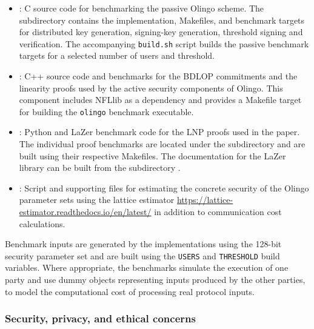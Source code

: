 \documentclass[nonacm,sigconf]{acmart}
\begin{document}
\begin{itemize}
  \item {}: C source code for benchmarking the passive Olingo scheme. The  subdirectory contains the implementation, Makefiles, and benchmark targets for distributed key generation, signing-key generation, threshold signing and verification. The accompanying \texttt{build.sh} script builds the passive benchmark targets for a selected number of users and threshold.
  \item {}: C++ source code and benchmarks for the BDLOP commitments and the linearity proofs used by the active security components of Olingo. This component includes NFLlib as a dependency and provides a Makefile target for building the \texttt{olingo} benchmark executable.
  \item {}: Python and LaZer benchmark code for the LNP proofs used in the paper. The individual proof benchmarks are located under the  subdirectory and are built using their respective Makefiles. The documentation for the LaZer library can be built from the subdirectory .
  \item {}: Script and supporting files for estimating the concrete security of the Olingo parameter sets using the lattice estimator \url{https://lattice-estimator.readthedocs.io/en/latest/} in addition to communication cost calculations.
\end{itemize}

Benchmark inputs are generated by the implementations using the 128-bit
security parameter set and are built using the \texttt{USERS} and \texttt{THRESHOLD} build
variables. Where appropriate, the benchmarks simulate the execution of one
party and use dummy objects representing inputs produced by the other parties,
to model the computational cost of processing real protocol inputs.


\subsubsection{Security, privacy, and ethical concerns}

\end{document}
